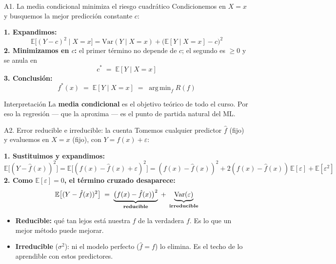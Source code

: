 \documentclass{beamer}
\newcommand{\E}{\mathbb{E}}
\newcommand{\Var}{\mathrm{Var}}
\newcommand{\1}{\mathbb{I}}
\DeclareMathOperator*{\argmin}{arg\,min}
\begin{document}
\begin{frame}{A1. La media condicional minimiza el riesgo cuadrático}
\small
Condicionemos en $X = x$ y busquemos la mejor predicción constante $c$:
\vspace{0.1cm}

\textbf{1. Expandimos:}
\[ \E\big[(Y - c)^2 \mid X = x\big] = \Var(Y \mid X = x) + \big(\E[Y \mid X = x] - c\big)^2 \]
\pause
\textbf{2. Minimizamos en $c$:} el primer término no depende de $c$; el segundo es $\geq 0$ y se anula en
\[ c^\ast \;=\; \E[Y \mid X = x] \]
\pause
\textbf{3. Conclusión:}
\[ f^\ast(x) \;=\; \E[Y \mid X = x] \;=\; \argmin_{f} R(f) \]
\pause
\begin{block}{Interpretación}
La \textbf{media condicional} es el objetivo teórico de todo el curso. Por eso la regresión --- que la aproxima --- es el punto de partida natural del ML.
\end{block}
\end{frame}

\begin{frame}{A2. Error reducible e irreducible: la cuenta}
\small
Tomemos cualquier predictor $\hat{f}$ (fijo) y evaluemos en $X = x$ (fijo), con $Y = f(x) + \varepsilon$:
\vspace{0.1cm}

\textbf{1. Sustituimos y expandimos:}
\[ \E\big[(Y - \hat{f}(x))^2\big] = \E\big[(f(x) - \hat{f}(x) + \varepsilon)^2\big] = (f(x) - \hat{f}(x))^2 + 2(f(x) - \hat{f}(x))\,\E[\varepsilon] + \E[\varepsilon^2] \]
\pause
\textbf{2. Como $\E[\varepsilon] = 0$, el término cruzado desaparece:}
\[ \E\big[(Y - \hat{f}(x))^2\big] \;=\; \underbrace{\big(f(x) - \hat{f}(x)\big)^2}_{\text{\textbf{reducible}}} \;+\; \underbrace{\Var(\varepsilon)}_{\text{\textbf{irreducible}}} \]
\pause

\begin{itemize}\itemsep4pt
  \item \textbf{Reducible:} qué tan lejos está nuestra $\hat{f}$ de la verdadera $f$. Es lo que un mejor método puede mejorar.
  \item \textbf{Irreducible} ($\sigma^2$): ni el modelo perfecto ($\hat{f} = f$) lo elimina. Es el techo de lo aprendible con estos predictores.
\end{itemize}
\end{frame}
\end{document}
